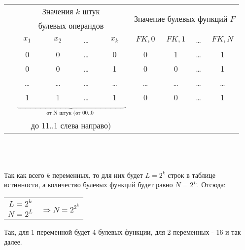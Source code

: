 \begin{minipage}[l]{9cm}

\begin{tabular}{c|c|c|c|c|c|c|c|c|}
\hhline{~--------}
& \multicolumn{4}{c|}{Значения $k$ штук} & \multicolumn{4}{c|}{\multirow{2}{*}{Значение булевых функций $F$}} \\
& \multicolumn{4}{c|}{булевых операндов} & \multicolumn{4}{c|}{}\\
\hhline{~--------}
& $x_1$ & $x_2$ & \dots & $x_k$ & $FK,0$ & $FK,1$ & \dots & $FK,N$ \\
\hhline{~--------}
 & 0 & 0 & \dots & 0 & 0 & 1 & \dots & 1\\
& 0 & 0 & \dots & 1 & 0 & 0 & \dots & 1\\
& \dots & \dots & \dots & \dots & \dots & \dots & \dots & \dots\\
\multirow{4}{*}{} & 1 & 1 & \dots & 1 & 0 & 0 & \dots & 1\\

\hhline{~--------}
\multicolumn{5}{c}{} & \multicolumn{4}{c}{$\underbrace{\qquad \qquad \qquad \qquad \qquad \qquad \qquad}_{\mbox{от N штук (от 00..0 }}$} \\
\multicolumn{5}{c}{} & \multicolumn{4}{c}{до 11..1 слева направо)}
\end{tabular}
\end{minipage}
\\
\\
\\
Так как всего $k$ переменных, то для них будет $L = 2^k$ строк в таблице истинности, а количество булевых функций будет равно $N = 2^L$. Отсюда:
\\
\begin{center}
\begin{tabular}{c c}
$L = 2^k$ & \multirow{2}{*}{$\Rightarrow N = 2^{2^{k}}$} \\
$N = 2^L$ & \\
\end{tabular}
\end{center}
Так, для 1 переменной будет 4 булевых функции, для 2 переменных - 16 и так далее.
\newpage
